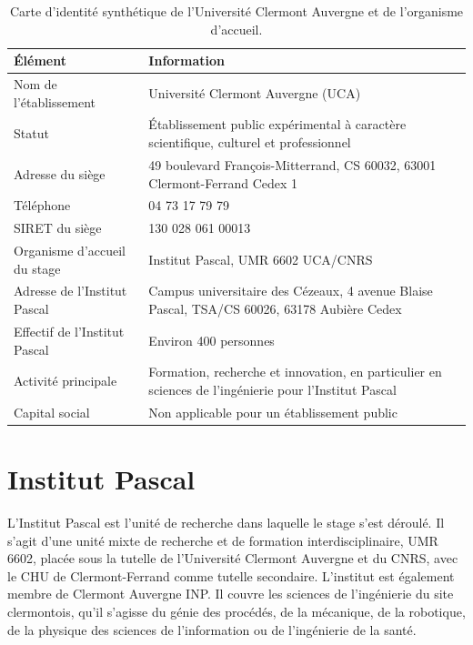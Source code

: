 \documentclass[a4paper,11pt]{report}
\begin{document}
\begin{table}[H]
  \centering
  \caption{Carte d'identité synthétique de l'Université Clermont Auvergne et de l'organisme d'accueil.}
  \label{tab:identite-organisme}
  \begin{tabular}{L{0.31\textwidth}L{0.60\textwidth}}
    \toprule
    Élément & Information \\
    \midrule
    Nom de l'établissement & Université Clermont Auvergne (UCA) \\
    Statut & Établissement public expérimental à caractère scientifique, culturel et professionnel \\
    Adresse du siège & 49 boulevard François-Mitterrand, CS 60032, 63001 Clermont-Ferrand Cedex 1 \\
    Téléphone & 04 73 17 79 79 \\
    SIRET du siège & 130 028 061 00013 \\
    Organisme d'accueil du stage & Institut Pascal, UMR 6602 UCA/CNRS \\
    Adresse de l'Institut Pascal & Campus universitaire des Cézeaux, 4 avenue Blaise Pascal, TSA/CS 60026, 63178 Aubière Cedex \\
    Effectif de l'Institut Pascal & Environ 400 personnes \\
    Activité principale & Formation, recherche et innovation, en particulier en sciences de l'ingénierie pour l'Institut Pascal \\
    Capital social & Non applicable pour un établissement public \\
    \bottomrule
  \end{tabular}
\end{table}

\section{Institut Pascal}

L'Institut Pascal est l'unité de recherche dans laquelle le stage s'est déroulé. Il s'agit d'une unité mixte de recherche et de formation interdisciplinaire, UMR 6602, placée sous la tutelle de l'Université Clermont Auvergne et du CNRS, avec le CHU de Clermont-Ferrand comme tutelle secondaire. L'institut est également membre de Clermont Auvergne INP. Il couvre les sciences de l'ingénierie du site clermontois, qu'il s'agisse du génie des procédés, de la mécanique, de la robotique, de la physique des sciences de l'information ou de l'ingénierie de la santé.
\end{document}
